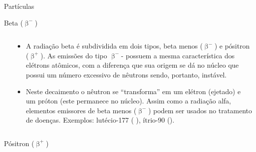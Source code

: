 \documentclass[presentation]{beamer}
\begin{document}
\begin{frame}[label={sec:orgdc27edd}]{Partículas}
\begin{block}{Beta (\(\upbeta^-\))}
\begin{columns}
\begin{column}{0.45\columnwidth}
\end{column}

\begin{column}{0.45\columnwidth}
\begin{itemize}
\item A radiação beta é subdividida em dois tipos, beta menos (\(\upbeta ^-\)) e pósitron (\(\upbeta ^+\)). As emissões do tipo \(\upbeta ^-\)- possuem a mesma característica dos elétrons atômicos, com a diferença que sua origem se dá no núcleo que possui um número excessivo de nêutrons sendo, portanto, instável.
\item Neste decaimento o nêutron se “transforma” em um elétron (ejetado) e um próton (este permanece no núcleo). Assim como a  radiação  alfa,  elementos  emissores  de  beta  menos  (\(\upbeta ^-\))  podem  ser  usados  no  tratamento de doenças. Exemplos: lutécio-177 ( ),  ítrio-90 ().
\end{itemize}
\end{column}
\end{columns}
\end{block}

\begin{block}{Pósitron (\(\upbeta^+\))}
\begin{columns}
\begin{column}{0.45\columnwidth}


\end{column}
\end{columns}
\end{block}
\end{frame}
\end{document}

